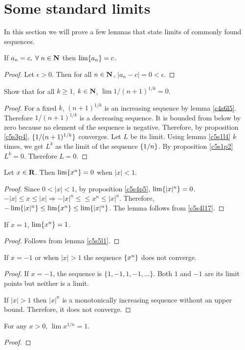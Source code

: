 \section{Some standard limits}\label{c5s5}
In this section we will prove a few lemmas that state limits of commonly
found sequences.
\begin{lem}\label{c5s5l1}
If $a_n = c, \;\forall\; n \in \mathbf{N}$ then $\lim\{a_n\} = c$.
\end{lem}
\begin{proof}
Let $\epsilon > 0$. Then for all $n \in \mathbf{N}$, $|a_n - c| = 0 < \epsilon$.
\end{proof}

\begin{lem}\label{c5s5l2}
Show that for all $k \ge 1$, $k \in \mathbf{N}$, $\lim 1/(n+1)^{1/k} = 0$.
\end{lem}
\begin{proof}
For a fixed $k$, $(n+1)^{1/k}$ is an increasing sequence by lemma 
\ref{c4s6l5}. Therefore $1/(n+1)^{1/k}$ is a decreasing sequence. It is 
bounded from below by zero because no element of the sequence is negative.
Therefore, by proposition \ref{c5s3p4}, $\{1/(n+1)^{1/k}\}$ converges.
Let $L$ be its limit. Using lemma \ref{c5s1l4} $k$ times, we get $L^k$
as the limit of the sequence $\{1/n\}$. By proposition \ref{c5s1p2} $L^k
 = 0$. Therefore $L = 0$.
\end{proof}

\begin{lem}\label{c5s5l3}
Let $x \in \mathbf{R}$. Then $\lim\{x^n\} = 0$ when $|x| < 1$.
\end{lem}
\begin{proof}
Since $0 < |x| < 1$, by proposition \ref{c5s4p5}, $\lim\{|x|^n\} = 0$.
$-|x| \le x \le |x| \Rightarrow -|x|^n \le \le x^n \le |x|^n$. Therefore,
$-\lim\{|x|^n\} \le \lim\{x^n\} \le \lim\{|x|^n\}$. The lemma follows
from \ref{c5s4l17}.
\end{proof}

\begin{lem}\label{c5s5l4}
If $x = 1$, $\lim\{x^n\} = 1$.
\end{lem}
\begin{proof}
Follows from lemma \ref{c5s5l1}.
\end{proof}

\begin{lem}\label{c5s5l5}
If $x = -1$ or when $|x| > 1$ the sequence $\{x^n\}$ does not converge.
\end{lem}
\begin{proof}
If $x = -1$, the sequence is $\{1, -1, 1, -1, \ldots\}$. Both $1$ and $-1$ 
are its limit points but neither is a limit. 

If $|x| > 1$ then $|x|^n$ is a monotonically increasing sequence without an
upper bound. Therefore, it does not converge.
\end{proof}

\begin{lem}\label{c5s5l6}
For any $x > 0$, $\lim x^{1/n} = 1$.
\end{lem}
\begin{proof}
\end{proof}

